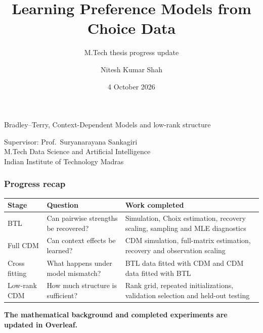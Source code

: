 \documentclass[white,aspect-ratio=16:9]{uom_ltx_talk_casson}
\title[short-title={M.Tech Thesis Progress}]{Learning Preference Models from Choice Data}
\subtitle{M.Tech thesis progress update}
\author{Nitesh Kumar Shah}
\date{4 October 2026}
\newcommand{\sectionemphasis}[1]{\textcolor{IITMBlue}{\textbf{#1}}}
\begin{document}
\begin{frame}
  \maketitle
  \vspace{-0.7cm}
  \begin{minipage}{0.74\textwidth}
    \large Bradley--Terry, Context-Dependent Models and low-rank structure

    \vspace{0.55cm}
    \normalsize
    Supervisor: Prof.\ Suryanarayana Sankagiri\\
    M.Tech Data Science and Artificial Intelligence\\
    Indian Institute of Technology Madras
  \end{minipage}
\end{frame}

\begin{frame}
  \frametitle{Progress recap}
  \vspace{0.25cm}
  \begin{table}
    \centering
    \begin{tabular}{p{}p{}p{}}
      \toprule
      \textbf{Stage} & \textbf{Question} & \textbf{Work completed} \\
      \midrule
      BTL & Can pairwise strengths be recovered? & Simulation, Choix estimation, recovery scaling, sampling and MLE diagnostics \\
      \addlinespace
      Full CDM & Can context effects be learned? & CDM simulation, full-matrix estimation, recovery and observation scaling \\
      \addlinespace
      Cross fitting & What happens under model mismatch? & BTL data fitted with CDM and CDM data fitted with BTL \\
      \addlinespace
      Low-rank CDM & How much structure is sufficient? & Rank grid, repeated initializations, validation selection and held-out testing \\
      \bottomrule
    \end{tabular}
  \end{table}
  \vfill
  \centering
  \sectionemphasis{The mathematical background and completed experiments are updated in Overleaf.}
\end{frame}
\end{document}
